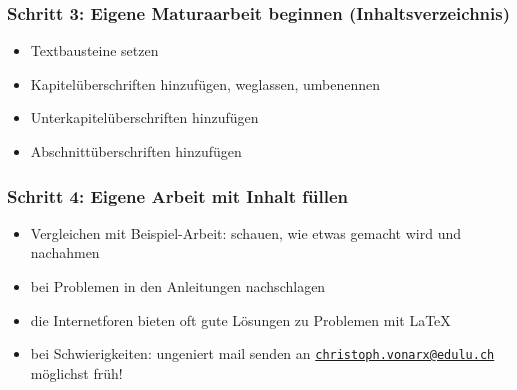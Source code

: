 \documentclass[11pt,german]{beamer}
\begin{document}
\frame
{
	\frametitle{Schritt 3: Eigene Maturaarbeit beginnen (Inhaltsverzeichnis)}
	
		\begin{itemize}
			\item Textbausteine setzen
	
			
			\item Kapitelüberschriften hinzufügen, weglassen, umbenennen \\
	
			\item Unterkapitelüberschriften hinzufügen \\
	
			\item Abschnittüberschriften hinzufügen \\
	
		\end{itemize}
	
}
\frame
{
	\frametitle{Schritt 4: Eigene Arbeit mit Inhalt füllen}
	\begin{itemize}
		\item Vergleichen mit Beispiel-Arbeit: schauen, wie etwas gemacht wird und nachahmen
		\item bei Problemen in den Anleitungen nachschlagen
		\item die Internetforen bieten oft gute Lösungen zu Problemen mit \LaTeX
		\item bei Schwierigkeiten: ungeniert mail senden an \href{mailto:christoph.vonarx@edulu.ch}{\tt{christoph.vonarx@edulu.ch}}\\
		{\color{green!80!white!70!black} möglichst früh!}
		
	\end{itemize}
	
}
\end{document}
